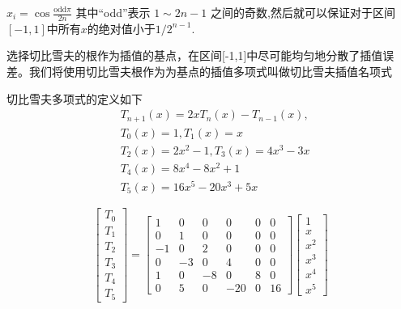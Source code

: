 \documentclass[UTF8,5pt,a4paper]{ctexart} %
\begin{document}
\begin{multicols}{4}
$x_i=\cos\frac{\mathrm{odd}\pi}{2n}$
其中“odd”表示 $1\sim2n-1$ 之间的奇数,然后就可以保证对于区间$[-1,1]$中所有$x$的绝对值小于$1/2^{n-1}$.

选择切比雪夫的根作为插值的基点，在区间[-1,1]中尽可能均匀地分散了插值误
差。我们将使用切比雪夫根作为为基点的插值多项式叫做切比雪夫插值名项式

切比雪夫多项式的定义如下
\begin{align*}
& T_{n+1}(x)=2xT_{n}(x)-T_{n-1}(x),\\
&T_{0}(x) =1 ,T_{1}\left(x\right) =x \\
&T_{2}(x) =2x^{2}-1 ,T_{3}(x) =4x^{3}-3x \\
&T_4(x)=8x^4-8x^2+1\\&T_5(x)=16x^5-20x^3+5x
\end{align*}

\begin{equation*}
    \begin{bmatrix}
    T_0 \\
    T_1 \\
    T_2 \\
    T_3 \\
    T_4 \\
    T_5
    \end{bmatrix}
    =
    \begin{bmatrix}
    1 & 0 & 0 & 0 & 0 & 0 \\
    0 & 1 & 0 & 0 & 0 & 0 \\
    -1 & 0 & 2 & 0 & 0 & 0 \\
    0 & -3 & 0 & 4 & 0 & 0 \\
    1 & 0 & -8 & 0 & 8 & 0 \\
    0 & 5 & 0 & -20 & 0 & 16
    \end{bmatrix}
    \begin{bmatrix}
    1 \\
    x \\
    x^2 \\
    x^3 \\
    x^4 \\
    x^5
    \end{bmatrix}
    \end{equation*}




\end{multicols}
\end{document}
